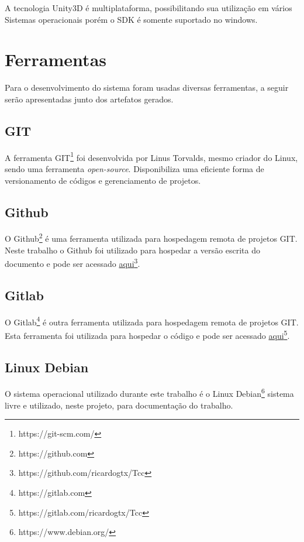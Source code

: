     A tecnologia Unity3D é multiplataforma, possibilitando sua utilização em vários Sistemas operacionais
    porém o SDK é somente suportado no windows.

    \section{Ferramentas}\label{sub:solFerramentas}
      Para o desenvolvimento do sistema foram usadas diversas ferramentas, a seguir serão apresentadas junto
    dos artefatos gerados.

    \subsection{GIT}\label{sub:git}
      A ferramenta GIT\footnote{https://git-scm.com/} foi desenvolvida por Linus Torvalds, mesmo criador do Linux,
    sendo uma ferramenta \textit{open-source}. Disponibiliza uma eficiente forma de versionamento de códigos e
    gerenciamento de projetos.

    \subsection{Github}\label{sub:github}
      O Github\footnote{https://github.com} é uma ferramenta utilizada para hospedagem remota de projetos GIT.
    Neste trabalho o Github foi utilizado para hospedar a versão escrita do documento e pode ser acessado \href{https://github.com/ricardogtx/Tcc}{aqui}\footnote{https://github.com/ricardogtx/Tcc}.

    \subsection{Gitlab}\label{sub:gitlab}
      O Gitlab\footnote{https://gitlab.com} é outra ferramenta utilizada para hospedagem remota de projetos GIT.
       Esta ferramenta foi utilizada para hospedar o código e pode ser acessado
    \href{https://gitlab.com/ricardogtx/Tcc}{aqui}\footnote{https://gitlab.com/ricardogtx/Tcc}.

    \subsection{Linux Debian}\label{sub:linuxdebian}
    		O sistema operacional utilizado durante este trabalho é o Linux Debian\footnote{https://www.debian.org/} sistema livre
    e utilizado, neste projeto, para documentação do trabalho.

